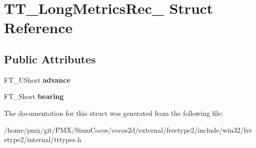 \hypertarget{structTT__LongMetricsRec__}{}\section{T\+T\+\_\+\+Long\+Metrics\+Rec\+\_\+ Struct Reference}
\label{structTT__LongMetricsRec__}
\subsection*{Public Attributes}
\begin{DoxyCompactItemize}
\item 
\mbox{\label{structTT__LongMetricsRec___a47100e42b52486bc374f80ed2795361d}} 
F\+T\+\_\+\+U\+Short {\bfseries advance}
\item 
\mbox{\label{structTT__LongMetricsRec___a0d74e3eb8611b0a5e89e338af35be4da}} 
F\+T\+\_\+\+Short {\bfseries bearing}
\end{DoxyCompactItemize}


The documentation for this struct was generated from the following file\+:\begin{DoxyCompactItemize}
\item 
/home/pmx/git/\+P\+M\+X/\+Simu\+Cocos/cocos2d/external/freetype2/include/win32/freetype2/internal/tttypes.\+h\end{DoxyCompactItemize}
